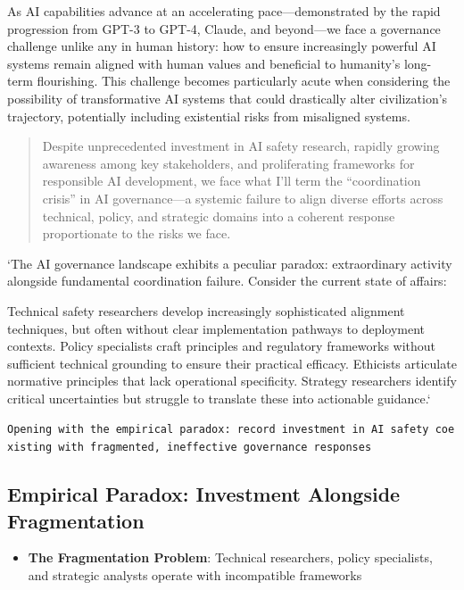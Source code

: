 \documentclass[
  11pt,
  letterpaper,
]{book}
\providecommand{\tightlist}{%
  \setlength{\itemsep}{0pt}\setlength{\parskip}{0pt}}
\begin{document}
As AI capabilities advance at an accelerating pace---demonstrated by the
rapid progression from GPT-3 to GPT-4, Claude, and beyond---we face a
governance challenge unlike any in human history: how to ensure
increasingly powerful AI systems remain aligned with human values and
beneficial to humanity's long-term flourishing. This challenge becomes
particularly acute when considering the possibility of transformative AI
systems that could drastically alter civilization's trajectory,
potentially including existential risks from misaligned systems.

\begin{quote}
Despite unprecedented investment in AI safety research, rapidly growing
awareness among key stakeholders, and proliferating frameworks for
responsible AI development, we face what I'll term the ``coordination
crisis'' in AI governance---a systemic failure to align diverse efforts
across technical, policy, and strategic domains into a coherent response
proportionate to the risks we face.
\end{quote}

`The AI governance landscape exhibits a peculiar paradox: extraordinary
activity alongside fundamental coordination failure. Consider the
current state of affairs:

Technical safety researchers develop increasingly sophisticated
alignment techniques, but often without clear implementation pathways to
deployment contexts. Policy specialists craft principles and regulatory
frameworks without sufficient technical grounding to ensure their
practical efficacy. Ethicists articulate normative principles that lack
operational specificity. Strategy researchers identify critical
uncertainties but struggle to translate these into actionable guidance.`

\texttt{Opening\ with\ the\ empirical\ paradox:\ record\ investment\ in\ AI\ safety\ coexisting\ with\ fragmented,\ ineffective\ governance\ responses}

\subsection{Empirical Paradox: Investment Alongside
Fragmentation}\label{sec-empirical-paradox}

\begin{itemize}
\tightlist
\item
  \textbf{The Fragmentation Problem}: Technical researchers, policy
  specialists, and strategic analysts operate with incompatible
  frameworks
\end{itemize}
\end{document}
